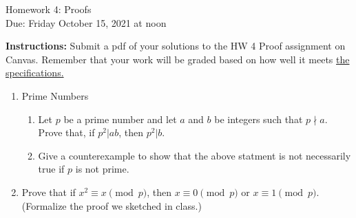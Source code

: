 \documentclass[10pt,a4paper]{article}
\begin{document}
\begin{center}
{\Large Homework 4: Proofs}\\
Due: Friday October 15, 2021 at noon\\


\end{center}
{\bf Instructions:} Submit a pdf of your solutions to the HW 4 Proof assignment on Canvas. Remember that your work will be graded based on how well it meets \href{https://docs.google.com/document/d/1emM06_WRh_h941rsjtRE9fRVndJtfRKd9gyS3Fs_rFA/edit?usp=sharing}{the specifications. }

\begin{enumerate}

 \item Prime Numbers
\begin{enumerate}
\item Let $p$ be a prime number and let $a$ and $b$ be integers such that $p\nmid a$. Prove that, if $p^2|ab$, then $p^2|b$. 
\item Give a counterexample to show that the above statment is not necessarily true if $p$ is not prime. 
\end{enumerate}
\item  Prove that if $x^2\equiv x \pmod{p}$, then $x\equiv 0\pmod{p}$ or $x\equiv 1\pmod{p}$. (Formalize the proof we sketched in class.)

\end{enumerate}
\end{document}

